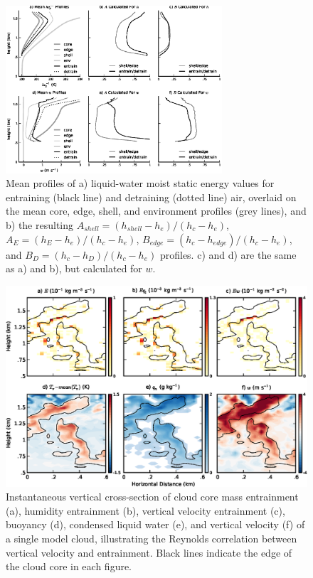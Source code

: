 \documentclass[12pt]{article}
\begin{document}
\begin{figure}[t]
  \noindent\includegraphics[width=19pc]{./figures/profile_plots}
  \caption{Mean profiles of a) liquid-water moist static energy values for 
  entraining (black line) and detraining (dotted line) air, overlaid on the 
  mean core, edge, shell, and environment profiles (grey lines), and b) the 
  resulting $A_{shell} = (h_{shell} - h_e)/(h_c - h_e)$, 
  $A_E = (h_E - h_e)/(h_c - h_e)$,  
  $B_{edge} = (h_c - h_{edge})/(h_c - h_e)$, and
  $B_D = (h_c - h_D)/(h_c - h_e)$ profiles.  c) and d) are the same 
  as a) and b), but calculated for $w$. 
}
  \label{fig:profile_plots}
\end{figure}

\begin{figure}[t]
  \noindent\includegraphics[width=39pc]{./figures/w_entrainment_example}
  \caption{Instantaneous vertical cross-section of cloud core mass entrainment 
  (a), humidity entrainment (b), vertical velocity entrainment (c), buoyancy 
  (d), condensed liquid water (e), and vertical velocity (f) of a single model
  cloud, illustrating the Reynolds correlation between vertical velocity and 
  entrainment.  Black lines indicate the edge of the cloud core in each figure.}
  \label{fig:w_entrainment_example}
\end{figure}
\end{document}
